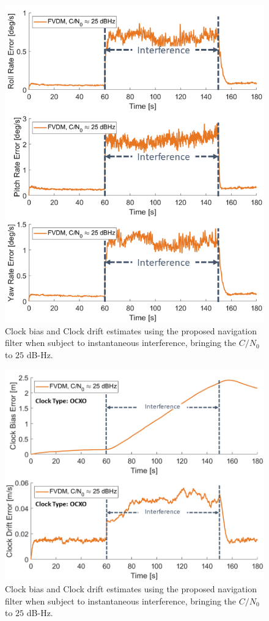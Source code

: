 \documentclass[12pt]{report}
\begin{document}
\begin{figure}[!ht]
  \centering
  \includegraphics[width=0.75\linewidth]{Figures/Results/trajectoryfigure/Slide10.PNG}
  \caption{Clock bias and Clock drift estimates using the proposed navigation filter when subject to instantaneous interference, bringing the \(C/N_0\) to \(25\) dB-Hz.}\label{fig:Ang25}
\end{figure}


\begin{figure}[!ht]
  \centering
  \includegraphics[width=0.75\linewidth]{Figures/Results/trajectoryfigure/Slide22.PNG}
  \caption{Clock bias and Clock drift estimates using the proposed navigation filter when subject to instantaneous interference, bringing the \(C/N_0\) to \(25\) dB-Hz.}\label{fig:Clk25}
\end{figure}
\end{document}
